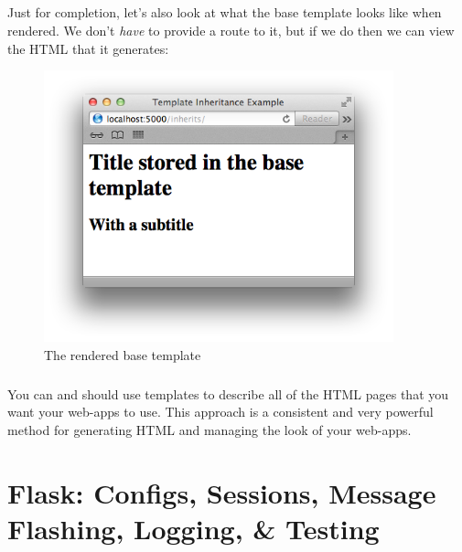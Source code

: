 \documentclass[12pt, a4paper, twoside]{book}
\begin{document}
\paragraph{} Just for completion, let's also look at what the base template looks like when rendered. We don't \emph{have} to provide a route to it, but if we do then we can view the HTML that it generates:

\begin{figure}[H]
\centering
\includegraphics[width=0.9\textwidth]{images/flask-template-inheritance-base}
\caption{The rendered base template}
\label{fig:flask-template-inheritance-base}
\end{figure}

\paragraph{} You can and should use templates to describe all of the HTML pages that you want your web-apps to use. This approach is a consistent and very powerful method for generating HTML and managing the look of your web-apps.


\chapter{Flask: Configs, Sessions, Message Flashing, Logging, \& Testing}
\label{lab06}
\paragraph{} 
\end{document}
